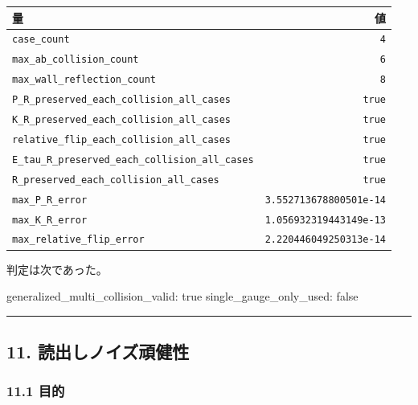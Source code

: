 \documentclass[
  a4paper,
]{article}
\newenvironment{Shaded}{}{}
\newcommand{\NormalTok}[1]{#1}
\newcounter{none} %
\begin{document}
{\def\LTcaptype{none} %
\begin{longtable}[]{@{}lr@{}}
\toprule\noalign{}
量 & 値 \\
\midrule\noalign{}
\endhead
\bottomrule\noalign{}
\endlastfoot
\texttt{case\_count} & \texttt{4} \\
\texttt{max\_ab\_collision\_count} & \texttt{6} \\
\texttt{max\_wall\_reflection\_count} & \texttt{8} \\
\texttt{P\_R\_preserved\_each\_collision\_all\_cases} & \texttt{true} \\
\texttt{K\_R\_preserved\_each\_collision\_all\_cases} & \texttt{true} \\
\texttt{relative\_flip\_each\_collision\_all\_cases} & \texttt{true} \\
\texttt{E\_tau\_R\_preserved\_each\_collision\_all\_cases} &
\texttt{true} \\
\texttt{R\_preserved\_each\_collision\_all\_cases} & \texttt{true} \\
\texttt{max\_P\_R\_error} & \texttt{3.552713678800501e-14} \\
\texttt{max\_K\_R\_error} & \texttt{1.056932319443149e-13} \\
\texttt{max\_relative\_flip\_error} & \texttt{2.220446049250313e-14} \\
\end{longtable}
}

判定は次であった。

\begin{Shaded}
\begin{Highlighting}[]
\NormalTok{generalized\_multi\_collision\_valid: true}
\NormalTok{single\_gauge\_only\_used: false}
\end{Highlighting}
\end{Shaded}

\begin{center}\rule{0.5\linewidth}{0.5pt}\end{center}

\subsection{11.
読出しノイズ頑健性}\label{ux8aadux51faux3057ux30ceux30a4ux30baux9811ux5065ux6027}

\subsubsection{11.1 目的}\label{ux76eeux7684-2}
\end{document}
